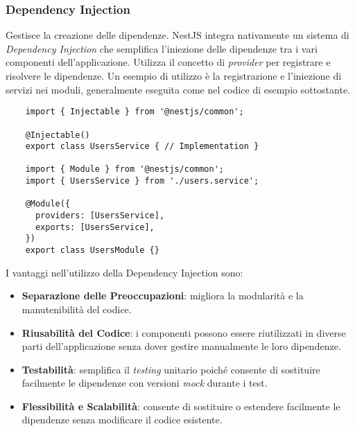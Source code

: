 \subsubsection{Dependency Injection}
Gestisce la creazione delle dipendenze. 
NestJS integra nativamente un sistema di \textit{Dependency Injection} che semplifica l'iniezione delle dipendenze tra i vari componenti dell'applicazione. 
Utilizza il concetto di \textit{provider} per registrare e risolvere le dipendenze.
Un esempio di utilizzo è la registrazione e l'iniezione di servizi nei moduli, generalmente eseguita come nel codice di esempio sottostante.
\begin{lstlisting}
	import { Injectable } from '@nestjs/common';

	@Injectable()
	export class UsersService { // Implementation }
	
	import { Module } from '@nestjs/common';
	import { UsersService } from './users.service';
	
	@Module({
	  providers: [UsersService],
	  exports: [UsersService],
	})
	export class UsersModule {}
\end{lstlisting}
I vantaggi nell'utilizzo della Dependency Injection sono:
\begin{itemize}
	\item \textbf{Separazione delle Preoccupazioni}: migliora la modularità e la manutenibilità del codice.
	\item \textbf{Riusabilità del Codice}: i componenti possono essere riutilizzati in diverse parti dell'applicazione senza dover gestire manualmente le loro dipendenze.
	\item \textbf{Testabilità}: semplifica il \textit{testing} unitario poiché consente di sostituire facilmente le dipendenze con versioni \textit{mock} durante i test.
	\item \textbf{Flessibilità e Scalabilità}: consente di sostituire o estendere facilmente le dipendenze senza modificare il codice esistente.
\end{itemize}



